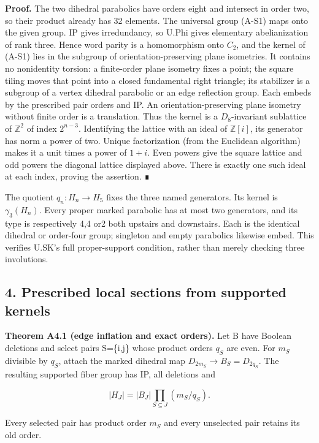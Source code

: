 \documentclass[
  11pt,
  a4paper,
]{article}
\begin{document}
\textbf{Proof.} The two dihedral parabolics have orders eight and
intersect in order two, so their product already has 32 elements. The
universal group (A-S1) maps onto the given group. IP gives irredundancy,
so U.Phi gives elementary abelianization of rank three. Hence word
parity is a homomorphism onto \(C_2\), and the kernel of (A-S1) lies in
the subgroup of orientation-preserving plane isometries. It contains no
nonidentity torsion: a finite-order plane isometry fixes a point; the
square tiling moves that point into a closed fundamental right triangle;
its stabilizer is a subgroup of a vertex dihedral parabolic or an edge
reflection group. Each embeds by the prescribed pair orders and IP. An
orientation-preserving plane isometry without finite order is a
translation. Thus the kernel is a \(D_8\)-invariant sublattice of
\(\mathbb Z^2\) of index \(2^{n-3}\). Identifying the lattice with an
ideal of \(\mathbb Z[i]\), its generator has norm a power of two. Unique
factorization (from the Euclidean algorithm) makes it a unit times a
power of \(1+i\). Even powers give the square lattice and odd powers the
diagonal lattice displayed above. There is exactly one such ideal at
each index, proving the assertion. ∎

The quotient \(q_n:H_n\to H_5\) fixes the three named generators. Its
kernel is \(\gamma_3(H_n)\). Every proper marked parabolic has at most
two generators, and its type is respectively 4,4 or2 both upstairs and
downstairs. Each is the identical dihedral or order-four group;
singleton and empty parabolics likewise embed. This verifies U.SK's full
proper-support condition, rather than merely checking three involutions.

\subsection{4. Prescribed local sections from supported
kernels}\label{prescribed-local-sections-from-supported-kernels}

\textbf{Theorem A4.1 (edge inflation and exact orders).} Let B have
Boolean deletions and select pairs S=\{i,j\} whose product orders
\(q_S\) are even. For \(m_S\) divisible by \(q_S\), attach the marked
dihedral map \(D_{2m_S}\to B_S=D_{2q_S}\). The resulting supported fiber
group has IP, all deletions and

\[
 |H_J|=|B_J|\prod_{S\subseteq J}(m_S/q_S).
\]

Every selected pair has product order \(m_S\) and every unselected pair
retains its old order.
\end{document}
